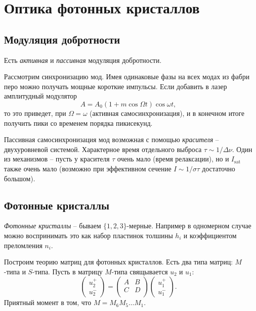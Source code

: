 \section{Оптика фотонных кристаллов}


\subsection{Модуляция добротности}


Есть \textit{активная} и \textit{пассивная} модуляция добротности. 

Рассмотрим синхронизацию мод. Имея одинаковые фазы на всех модах из фабри перо можно получать мощные короткие импульсы. Если добавить в лазер амплитудный модулятор
\begin{equation*}
    A = A_0 (1 + m \cos \Omega t) \cos \omega t,
\end{equation*}
то это приведет, при $\Omega = \omega$ (активная самосинхронизация), и в конечном итоге получить пики со временем порядка пикисекунд. 



Пассивная самосинхронизация мод возможная с помощью \textit{красителя} -- двухуровневой системой. Характерное время отдельного выброса $\tau \sim 1/\Delta \nu$. Один из механизмов -- пусть у красителя $\tau$  очень мало (время релаксации), но и $I_{\text{sat}}$ также очень мало (возможно при эффективном сечение $I \sim 1/\sigma\tau$ достаточно большом). 





\subsection{Фотонные кристаллы}

\textit{Фотонные кристаллы} -- бываем $\{1, 2, 3\}$-мерные. Например в одномерном случае можно воспринимать это как набор пластинок толшины $h_i$ и коэффициентом преломления $n_i$. 


Построим теорию матриц для фотонных кристаллов. Есть два типа матриц: $M$-типа и $S$-типа. Пусть в матрицу $M$-типа свящывается $u_2$ и $u_1$:
\begin{equation*}
    \begin{pmatrix}
        u_2^+ \\ u_2^-
    \end{pmatrix} = 
    \begin{pmatrix}
        A & B \\
        C & D \\
    \end{pmatrix}
    \begin{pmatrix}
        u_1^+ \\ u_1^-
    \end{pmatrix}.
\end{equation*}
Приятный момент в том, что $M = M_6 M_5 \ldots M_1$. 

